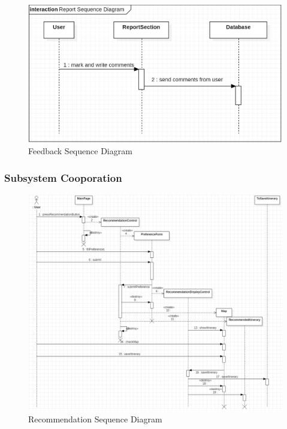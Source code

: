 \documentclass[10pt]{article}
\begin{document}
\begin{figure}[H]
    \centering
    
    \includegraphics[width=14cm]{report.jpg}
    \caption{Feedback Sequence Diagram}
    \label{Feedback Sequence Diagram}
\end{figure}

\subsubsection{Subsystem Cooporation}

\begin{figure}[H]
    \centering
    
    \includegraphics[width=14cm]{recommendation.png}
    \caption{Recommendation Sequence Diagram}
    \label{Recommendation Sequence Diagram}
\end{figure}
\end{document}
